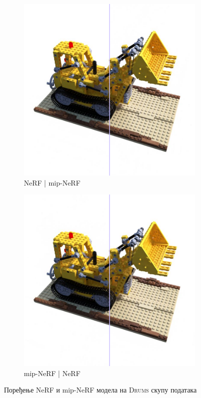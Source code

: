 \documentclass[12pt, a4paper, twoside]{book}
\numberwithin{equation}{chapter}
\numberwithin{theorem}{section}
\numberwithin{definition}{section}
\numberwithin{definitionChapter}{chapter}
\begin{document}
	\begin{figure}[H]
		\centering
			\begin{subfigure}{0.475\textwidth}
			\centering
			\includegraphics[scale=0.25]{img/comparison/nerf_vs_mipnerf_lego_31.png}
			\caption{NeRF | mip-NeRF}
		\end{subfigure}
		\begin{subfigure}{0.475\textwidth}
			\centering
			\includegraphics[scale=0.25]{img/comparison/mipnerf_vs_nerf_lego_31.png}
			\caption{mip-NeRF | NeRF}
		\end{subfigure}
		\caption{Поређење NeRF и mip-NeRF модела на \textsc{Drums} скупу података}
		\label{fig-lego-comparison}
	\end{figure}
\end{document}
